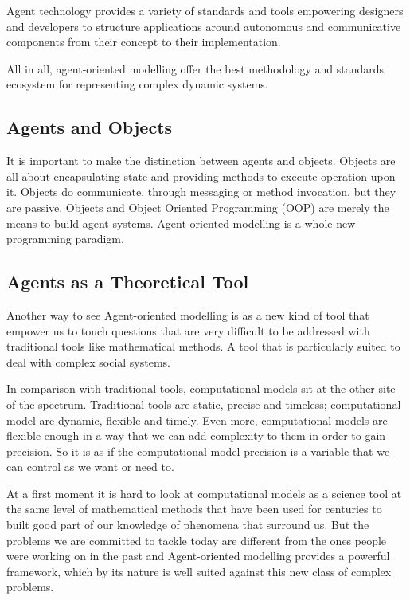 Agent technology provides a variety of standards and tools empowering designers and developers to structure applications around autonomous and communicative components from their concept to their implementation. \cite{al3roadmap}

All in all, agent-oriented modelling offer the best methodology and standards ecosystem for representing complex dynamic systems.

\subsection{Agents and Objects}

It is important to make the distinction between agents and objects. Objects are all about encapsulating state and providing methods to execute operation upon it. Objects do communicate, through messaging or method invocation, but they are passive. Objects and Object Oriented Programming (OOP) are merely the means to build agent systems. Agent-oriented modelling is a whole new programming paradigm. 

\subsection{Agents as a Theoretical Tool}

Another way to see Agent-oriented modelling is as a new kind of tool that empower us to touch questions that are very difficult to be addressed with traditional tools like mathematical methods. A tool that is particularly suited to deal with complex social systems.

In comparison with traditional tools, computational models sit at the other site of the spectrum. Traditional tools are static, precise and timeless; computational model are dynamic, flexible and timely. Even more, computational models are flexible enough in a way that we can add complexity to them in order to gain precision. So it is as if the computational model precision is a variable that we can control as we want or need to.

At a first moment it is hard to look at computational models as a science tool at the same level of mathematical methods that have been used for centuries to built good part of our knowledge of phenomena that surround us. But the problems we are committed to tackle today are different from the ones people were working on in the past and Agent-oriented modelling provides a powerful framework, which by its nature is well suited against this new class of complex problems.

